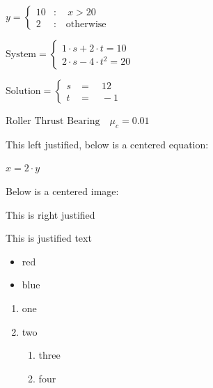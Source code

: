 \documentclass[
  a4paper,
]{article}
\providecommand{\tightlist}{%
  \setlength{\itemsep}{0pt}\setlength{\parskip}{0pt}}
\begin{document}
\(y = \begin{cases} 10 &: \quad x>20 \\ 2 &: \quad \text{otherwise} \end{cases}\)

\(\text{System} = \begin{cases} 1\cdot s+2\cdot t=10 &  \\ 2\cdot s-4\cdot t^2=20 &  \end{cases}\)

\(\text{Solution} = \begin{cases} s & = \quad 12 \\ t & = \quad -1 \end{cases}\)

\(\text{Roller Thrust Bearing} \quad \mu_{c} = 0.01\)

This left justified, below is a centered equation:

\begin{center}

\(x=2\cdot y\)

\end{center}

Below is a centered image:

\begin{center}

\end{center}

\begin{flushright}

This is right justified

\end{flushright}

This is justified text

\begin{itemize}
\tightlist
\item
  red
\item
  blue
\end{itemize}

\begin{enumerate}
\def\labelenumi{\arabic{enumi}.}
\tightlist
\item
  one
\item
  two

  \begin{enumerate}
  \def\labelenumii{\alph{enumii}.}
  \tightlist
  \item
    three
  \item
    four
  \end{enumerate}
\end{enumerate}
\end{document}
